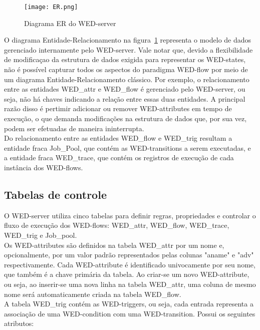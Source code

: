 \documentclass[conference]{IEEEtran}
\begin{document}
\begin{figure}[!t]
\centering
\texttt{[image: ER.png]}
\caption{Diagrama ER do WED-server}
\label{fig_er}

\end{figure}
 O diagrama Entidade-Relacionamento na figura~\ref{fig_er} representa o modelo de dados gerenciado internamente pelo 
WED-server. Vale notar que, devido a flexibilidade de modificaçao da estrutura de dados exigida para representar os WED-states, 
não é possível capturar todos os aspectos do paradigma WED-flow por meio de um diagrama Entidade-Relacionamento clássico. Por exemplo,
o relacionamento entre as entidades WED\_attr e WED\_flow é gerenciado pelo WED-server, ou seja, não há chaves indicando
a relação entre essas duas entidades. A principal razão disso é pertimir adicionar ou remover WED-attributes em tempo de execução, 
o que demanda modificações na estrutura de dados que, por sua vez, podem ser efetuadas de maneira ininterrupta.
\\
\indent Do relacionamento entre as entidades WED\_flow e WED\_trig resultam a entidade fraca Job\_Pool, que contém as WED-transitions
a serem executadas, e a entidade fraca WED\_trace, que contém os registros de execução de cada instância dos WED-flows.

\subsection{Tabelas de controle}

O WED-server utiliza cinco tabelas para definir regras, propriedades e controlar o fluxo de execução dos WED-flows: WED\_attr,
WED\_flow, WED\_trace, WED\_trig e Job\_pool.
\\
\indent  Os WED-attributes são definidos na tabela WED\_attr por um nome e, opcionalmente, por um valor padrão representados 
pelas colunas "aname" e "adv" respectivamente. Cada WED-attribute é identificado univocamente por seu nome, que também é 
a chave primária da tabela. Ao criar-se um novo WED-attribute, ou seja, ao inserir-se uma nova linha na tabela WED\_attr, 
uma coluna de mesmo nome será automaticamente criada na tabela WED\_flow.
\\
\indent A tabela WED\_trig contém as WED-triggers, ou seja, cada entrada representa a associação de uma WED-condition com uma 
WED-transition. Possui os seguintes atributos:
\end{document}
